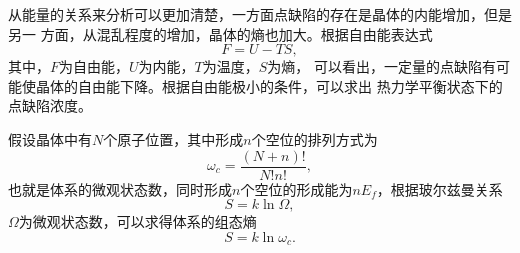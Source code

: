             从能量的关系来分析可以更加清楚，一方面点缺陷的存在是晶体的内能增加，但是另一
            方面，从混乱程度的增加，晶体的熵也加大。根据自由能表达式
            \begin{equation}
                F=U-TS,
            \end{equation}
            其中，$F$为自由能，$U$为内能，$T$为温度，$S$为熵，
            可以看出，一定量的点缺陷有可能使晶体的自由能下降。根据自由能极小的条件，可以求出
            热力学平衡状态下的点缺陷浓度。

            假设晶体中有$N$个原子位置，其中形成$n$个空位的排列方式为
            \begin{equation}
                \omega_c=\frac{\left( N+n \right)!}{N!n!},
            \end{equation}
            也就是体系的微观状态数，同时形成$n$个空位的形成能为$nE_f$，根据玻尔兹曼关系
            \begin{equation}
                S=k\ln{\Omega},
            \end{equation}
            $\Omega$为微观状态数，可以求得体系的组态熵
            \begin{equation}
                S=k\ln\omega_c.
            \end{equation}
            

